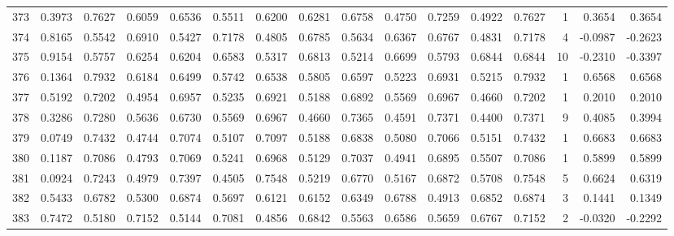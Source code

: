 \begin{tabular}{lrrrrrrrrrrrrrrr}
373 &      0.3973 &  0.7627 &  0.6059 &  0.6536 &  0.5511 &  0.6200 &  0.6281 &  0.6758 &  0.4750 &  0.7259 &   0.4922 &     0.7627 &      1 &                    0.3654 &                     0.3654 \\
374 &      0.8165 &  0.5542 &  0.6910 &  0.5427 &  0.7178 &  0.4805 &  0.6785 &  0.5634 &  0.6367 &  0.6767 &   0.4831 &     0.7178 &      4 &                   -0.0987 &                    -0.2623 \\
375 &      0.9154 &  0.5757 &  0.6254 &  0.6204 &  0.6583 &  0.5317 &  0.6813 &  0.5214 &  0.6699 &  0.5793 &   0.6844 &     0.6844 &     10 &                   -0.2310 &                    -0.3397 \\
376 &      0.1364 &  0.7932 &  0.6184 &  0.6499 &  0.5742 &  0.6538 &  0.5805 &  0.6597 &  0.5223 &  0.6931 &   0.5215 &     0.7932 &      1 &                    0.6568 &                     0.6568 \\
377 &      0.5192 &  0.7202 &  0.4954 &  0.6957 &  0.5235 &  0.6921 &  0.5188 &  0.6892 &  0.5569 &  0.6967 &   0.4660 &     0.7202 &      1 &                    0.2010 &                     0.2010 \\
378 &      0.3286 &  0.7280 &  0.5636 &  0.6730 &  0.5569 &  0.6967 &  0.4660 &  0.7365 &  0.4591 &  0.7371 &   0.4400 &     0.7371 &      9 &                    0.4085 &                     0.3994 \\
379 &      0.0749 &  0.7432 &  0.4744 &  0.7074 &  0.5107 &  0.7097 &  0.5188 &  0.6838 &  0.5080 &  0.7066 &   0.5151 &     0.7432 &      1 &                    0.6683 &                     0.6683 \\
380 &      0.1187 &  0.7086 &  0.4793 &  0.7069 &  0.5241 &  0.6968 &  0.5129 &  0.7037 &  0.4941 &  0.6895 &   0.5507 &     0.7086 &      1 &                    0.5899 &                     0.5899 \\
381 &      0.0924 &  0.7243 &  0.4979 &  0.7397 &  0.4505 &  0.7548 &  0.5219 &  0.6770 &  0.5167 &  0.6872 &   0.5708 &     0.7548 &      5 &                    0.6624 &                     0.6319 \\
382 &      0.5433 &  0.6782 &  0.5300 &  0.6874 &  0.5697 &  0.6121 &  0.6152 &  0.6349 &  0.6788 &  0.4913 &   0.6852 &     0.6874 &      3 &                    0.1441 &                     0.1349 \\
383 &      0.7472 &  0.5180 &  0.7152 &  0.5144 &  0.7081 &  0.4856 &  0.6842 &  0.5563 &  0.6586 &  0.5659 &   0.6767 &     0.7152 &      2 &                   -0.0320 &                    -0.2292 \\

\end{tabular}
